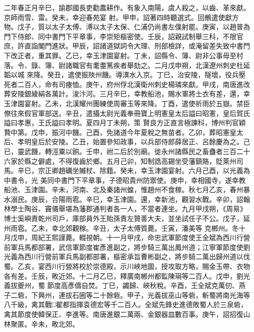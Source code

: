 \begin{pinyinscope}
 二年春正月辛巳，諭郡國長吏勸農耕作。有象入南陽，虞人殺之，以齒、革來獻。京師雨雪、雷。癸未，幸迎春苑宴
 射。甲申，詔著四時聽選式。回鶻遣使獻方物。戊子，質以太子太傅、溥以太子太保、仁浦仍尚書左僕射罷。庚寅，以趙普為門下侍郎、同中書門下平章事，李崇矩樞密使。壬辰，詔親試制舉三科，不限官庶，許直詣閣門進狀。甲辰，詔諸道獄詞令大理、刑部檢詳，或淹留差失致中書門下改正者，重其罪。乙已，幸玉津園宴射。丁未，詔縣令、簿、尉非公事毋至村落。令、錄、簿、尉諸職官有耄耋篤疾者舉劾之。二月戊申朔，北漢遼州刺史杜延韜以城
 來降。癸丑，遣使振陜州饑。導潩水入京。丁巳，治安陵，隧壞，役兵壓死者二百人，命有司瘞恤。庚午，府州俘北漢衛州刺史楊璘來獻。甲戌，南唐進改葬安陵銀綾絹各萬計。浚汴河。三月辛巳，幸教船池，賜水軍將士衣有差，還，幸玉津園宴射。乙未，北漢耀州團練使周審玉等來降。丁酉，遣使祈雨於五嶽。禁臣僚往來假官軍部送。辛丑，遣攝太尉光義奉冊寶上明憲皇太后謚曰昭憲，皇后賀氏謚曰孝惠，王氏謚曰孝明。夏四月丁未朔，策
 賢良方正直言極諫科，博州判官穎贄中第。戊申，振河中饑。己酉，免諸道今年夏稅之無苗者。乙卯，葬昭憲皇太后、孝明皇后於安陵。乙丑，始置參知政事，以兵部侍郎薛居正、呂餘慶為之。己已，靈武饑，轉涇粟以餉。壬申，祔二后於別廟。徙永州諸縣民之畜蠱者三百二十六家於縣之僻處，不得復齒於鄉。五月己卯，知制誥高錫坐受藩鎮賂，貶萊州司馬。辛巳，宗正卿趙礪坐贓杖、除籍。癸未，幸玉津園宴射。六月己酉，以光義為中書令，光
 美同中書門下平章事，子德昭貴州防禦使。庚申，幸相國寺，遂幸教船池、玉津園。辛未，河南、北及秦諸州蝗，惟趙州不食稼。秋七月乙亥，春州暴水溺民。庚辰，合陽雨雹。辛巳，幸玉津園。還，幸新池，觀習水戰。辛卯，詔翰林學士陶谷、竇儀舉堪為藩郡通判者各一人，不當者連坐。九月甲戌朔，《周易》博士奚嶼責乾州司戶，庫部員外王貽孫責左贊善大夫，並坐試任子不公。戊子，延州雨雹。乙未，幸北郊觀稼。辛丑，太子太傅質薨。壬寅，潘美等
 克郴州。冬十月戊申，周紀王熙謹薨。輟視朝。十一月甲戌，命忠武軍節度使王全斌為西川行營前軍兵馬都部署，武信軍節度崔彥進副之，將步騎三萬出鳳州道；江寧軍節度使劉光義為西川行營前軍兵馬副都部署，樞密承旨曹彬副之，將步騎二萬出歸州道以伐蜀。乙亥，宴西川行營將校於崇德殿，示川峽地圖，授攻取方略，賜金玉帶、衣物各有差。壬辰，畋近郊。十二月乙巳，釋廣南郴州都監陳琄等二百人。戊申，劉光義拔夔州，蜀
 節度高彥儔自焚。丁巳，蠲歸、峽秋稅。辛酉，王全斌克萬仞、燕子二砦，下興州，連拔石圌等二十餘砦。甲子，光義拔巫山等砦，斬蜀將南光海等八千級，禽其戰□翟都指揮袁德宏等千二百人。全斌先鋒史進德敗蜀人於三泉砦，禽其節度使韓保正、李進等。南唐進銀二萬兩、金銀器皿數百事。庚午，詔招復山林聚匿。辛未，畋北郊。



\end{pinyinscope}
